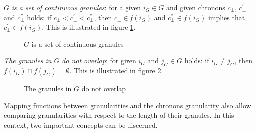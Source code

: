 \begin{property}
$G$ \emph{is a set of continuous granules}: for a given $i_{G} \in G$ and given chronons $c_\bot$, $c^{'}_\bot$ and $c^{''}_\bot$ holds: if $c_\bot < c^{'}_\bot < c^{''}_\bot$, then $c_\bot \in f(i_G)$ and $c^{''}_\bot \in f(i_G)$ implies that $c^{'}_\bot \in f(i_G)$. This is illustrated in figure \ref{fig:granularity-prop2}.
\begin{figure}
\centering

\caption{$G$ is a set of continuous granules}
\label{fig:granularity-prop2}
\end{figure}
\end{property}

\begin{property}
\emph{The granules in} $G$ \emph{do not overlap}: for given $i_{G}\text{ and } j_{G} \in G$ holds: if $i_G \neq j_G$, then $f(i_G) \cap f(j_G) = \emptyset$. This is illustrated in figure \ref{fig:granularity-prop3}.
\begin{figure}
\centering

\caption{The granules in $G$ do not overlap}
\label{fig:granularity-prop3}
\end{figure}
\end{property}

Mapping functions between granularities and the chronons granularity also allow comparing granularities with respect to the length of their granules. In this context, two important concepts can be discerned.

